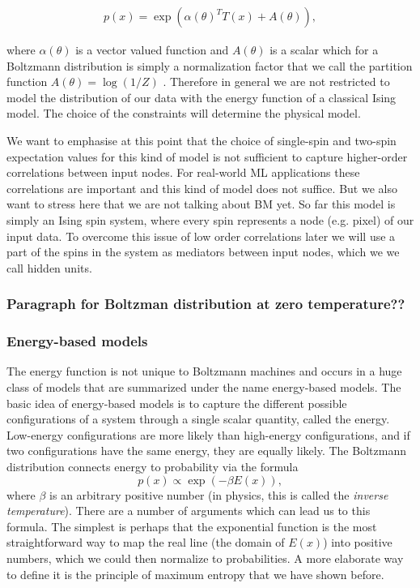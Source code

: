 \documentclass[nofootinbib, superscriptaddress, prl]{revtex4}
\begin{document}
\begin{align}
	p(x) = \exp \left( \alpha(\theta)^T T(x) + A(\theta) \right),
\end{align}

where $\alpha(\theta)$ is a vector valued function and $A(\theta)$ is a scalar which for a Boltzmann distribution is simply a normalization factor that we call the partition function $A(\theta) = \log(1/Z)$ \cite{li_learning_2013}. Therefore in general we are not restricted to model the distribution of our data with the energy function of a classical Ising model. The choice of the constraints will determine the physical model.

We want to emphasise at this point that the choice of single-spin and two-spin expectation values for this kind of model is not sufficient to capture higher-order correlations between input nodes. For real-world ML applications these correlations are important and this kind of model does not suffice. But we also want to stress here that we are not talking about BM yet. So far this model is simply an Ising spin system, where every spin represents a node (e.g. pixel) of our input data. To overcome this issue of low order correlations later we will use a part of the spins in the system as mediators between input nodes, which we we call hidden units.

\subsubsection{Paragraph for Boltzman distribution at zero temperature??}

\subsubsection{Energy-based models}

The energy function is not unique to Boltzmann machines and occurs in a huge class of models that are summarized under the name energy-based models. The basic idea of energy-based models is to capture the different possible configurations of a system through a single scalar quantity, called the energy. Low-energy configurations are more likely than high-energy configurations, and if two configurations have the same energy, they are equally likely. The Boltzmann distribution connects energy to probability via the formula
\begin{equation}
 p(x) \propto \exp(-\beta E(x)),
\end{equation}
where $\beta$ is an arbitrary positive number (in physics, this is called the \emph{inverse temperature}). 
There are a number of arguments which can lead us to this formula. The simplest is perhaps that the exponential function is the most straightforward way to map the real line (the domain of $E(x)$) into positive numbers, which we could then normalize to probabilities. A more elaborate way to define it is the principle of maximum entropy that we have shown before.
\end{document}
